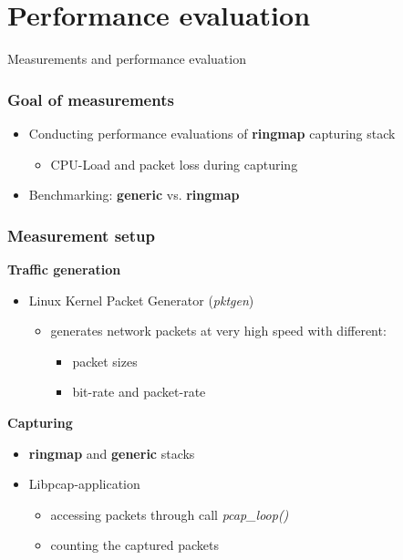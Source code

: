 \documentclass{beamer}
\begin{document}
\section{Performance evaluation}
\begin{frame}
	\begin{center}
	\huge{Measurements and performance evaluation}
	\end{center}
\end{frame}

\begin{frame}
\frametitle{Goal of measurements}
\begin{itemize}
	\item Conducting performance evaluations of \textbf{ringmap} capturing stack
		\begin{itemize}
			\item CPU-Load and packet loss during capturing\newline
		\end{itemize}
	\item Benchmarking: \textbf{generic} vs. \textbf{ringmap}
\end{itemize}
\end{frame}

\begin{frame}
\frametitle{Measurement setup}
\textbf{Traffic generation}
\begin{itemize}
	\item Linux Kernel Packet Generator (\emph{pktgen})
		\begin{itemize}
			\item generates network packets at very high speed with different: 
				\begin{itemize}
					\item packet sizes
					\item bit-rate and packet-rate
				\end{itemize}
		\end{itemize}
\end{itemize}
\textbf{Capturing}
\begin{itemize}
	\item \textbf{ringmap} and \textbf{generic} stacks
	\item Libpcap-application
		\begin{itemize}
			\item accessing packets through call \emph{pcap\_loop()}
			\item counting the captured packets
		\end{itemize}
\end{itemize}
\end{frame}
\end{document}
